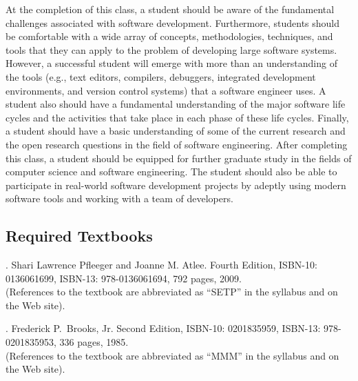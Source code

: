 At the completion of this class, a student should be aware of the fundamental challenges associated with software
development.  Furthermore, students should be comfortable with a wide array of concepts, methodologies, techniques, and
tools that they can apply to the problem of developing large software systems.  However, a successful student will
emerge with more than an understanding of the tools (e.g., text editors, compilers, debuggers, integrated development
environments, and version control systems) that a software engineer uses.  A student also should have a fundamental
understanding of the major software life cycles and the activities that take place in each phase of these life cycles.
Finally, a student should have a basic understanding of some of the current research and the open research questions in
the field of software engineering.  After completing this class, a student should be equipped for further graduate study
in the fields of computer science and software engineering.  The student should also be able to participate in
real-world software development projects by adeptly using modern software tools and working with a team of developers.

\subsection*{Required Textbooks}


. Shari Lawrence Pfleeger and Joanne M. Atlee.
Fourth Edition, ISBN-10: 0136061699, ISBN-13: 978-0136061694, 792 pages, 2009. \\
(References to the textbook are abbreviated as ``SETP'' in the syllabus and on the Web site).


. Frederick P.\ Brooks, Jr.
Second Edition, ISBN-10: 0201835959, ISBN-13: 978-0201835953, 336 pages, 1985. \\
(References to the textbook are abbreviated as ``MMM'' in the syllabus and on the Web site).

